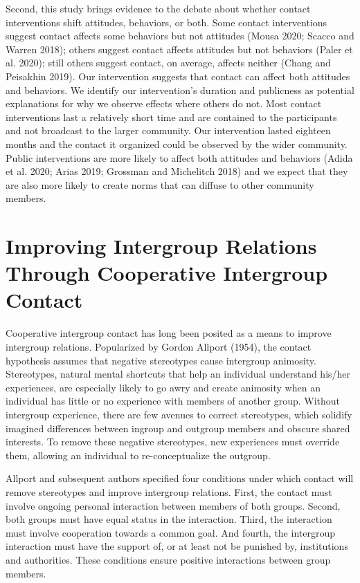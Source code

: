 \documentclass[11pt]{article}
\begin{document}
Second, this study brings evidence to the debate about whether contact
interventions shift attitudes, behaviors, or both. Some contact
interventions suggest contact affects some behaviors but not attitudes
(Mousa 2020; Scacco and Warren 2018); others suggest contact affects
attitudes but not behaviors (Paler et al. 2020); still others suggest
contact, on average, affects neither (Chang and Peisakhin 2019). Our
intervention suggests that contact can affect both attitudes and
behaviors. We identify our intervention's duration and publicness as
potential explanations for why we observe effects where others do not.
Most contact interventions last a relatively short time and are
contained to the participants and not broadcast to the larger community.
Our intervention lasted eighteen months and the contact it organized
could be observed by the wider community. Public interventions are more
likely to affect both attitudes and behaviors (Adida et al. 2020; Arias
2019; Grossman and Michelitch 2018) and we expect that they are also
more likely to create norms that can diffuse to other community members.

\hypertarget{improving-intergroup-relations-through-cooperative-intergroup-contact}{%
\section{Improving Intergroup Relations Through Cooperative Intergroup
Contact}\label{improving-intergroup-relations-through-cooperative-intergroup-contact}}

Cooperative intergroup contact has long been posited as a means to
improve intergroup relations. Popularized by Gordon Allport (1954), the
contact hypothesis assumes that negative stereotypes cause intergroup
animosity. Stereotypes, natural mental shortcuts that help an individual
understand his/her experiences, are especially likely to go awry and
create animosity when an individual has little or no experience with
members of another group. Without intergroup experience, there are few
avenues to correct stereotypes, which solidify imagined differences
between ingroup and outgroup members and obscure shared interests. To
remove these negative stereotypes, new experiences must override them,
allowing an individual to re-conceptualize the outgroup.

Allport and subsequent authors specified four conditions under which
contact will remove stereotypes and improve intergroup relations. First,
the contact must involve ongoing personal interaction between members of
both groups. Second, both groups must have equal status in the
interaction. Third, the interaction must involve cooperation towards a
common goal. And fourth, the intergroup interaction must have the
support of, or at least not be punished by, institutions and
authorities. These conditions ensure positive interactions between group
members.
\end{document}
